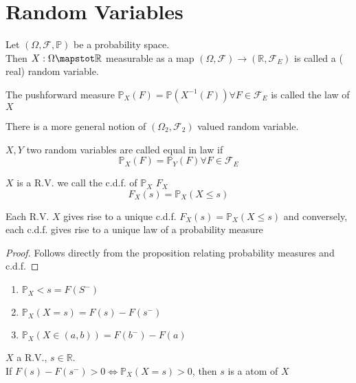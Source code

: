 \documentclass[../main.tex]{subfiles}
\begin{document}
\section{Random Variables}
\begin{defn}
	Let $( \Omega, \mathcal{F}, \mathbb{P}) $ be a probability space.\\
	Then $X: \Omega\mapstot \mathbb{R}$ measurable as a map $ ( \Omega, \mathcal{F}) \to ( \mathbb{R}, \mathcal{F}_E) $ is called a ( real) random variable.
\end{defn}
The pushforward measure $ \mathbb{P}_X ( F) = \mathbb{P}( X^{-1}( F) ) \forall F \in \mathcal{F}_E$ is called the law of $X$ 
\begin{rmq}
	There is a more general notion of $( \Omega_2, \mathcal{F}_2) $ valued random variable.
\end{rmq}
\begin{defn}[Equality of RV]
	$X,Y$ two random variables are called equal in law if
	\[ 
		\mathbb{P}_X( F) = \mathbb{P}_Y( F) \forall F \in \mathcal{F}_E
	\]
	
\end{defn}
\begin{defn}
$X$ is a R.V. we call the c.d.f. of $\mathbb{P}_X$ $F_X$ 
\[ 
	F_X( s) = \mathbb{P}_X( X \leq s ) 
\]
			
\end{defn}
\begin{propo}
	Each R.V. $X$ gives rise to a unique c.d.f. $F_X( s) = \mathbb{P}_X( X \leq s) $ and conversely, each c.d.f. gives rise to a unique law of a probability measure
\end{propo}
\begin{proof}
Follows directly from the proposition relating probability measures and c.d.f.
\end{proof}
\begin{lemma}
\begin{enumerate}
	\item $\mathbb{P}_X<s = F( S^{-}) $ 
	\item $\mathbb{P}_X( X=s) = F( s) -F( s^{-}) $ 
	\item $ \mathbb{P}_X( X\in ( a,b) ) = F( b^{-}) - F( a) $ 
\end{enumerate}
\end{lemma}
\begin{defn}
$X$ a R.V., $s\in \mathbb{R}$.\\
If $F( s) - F( s^{-}) >0 \iff \mathbb{P}_X( X=s) >0$, then $s$ is a atom of $X$ 
\end{defn}
\end{document}
